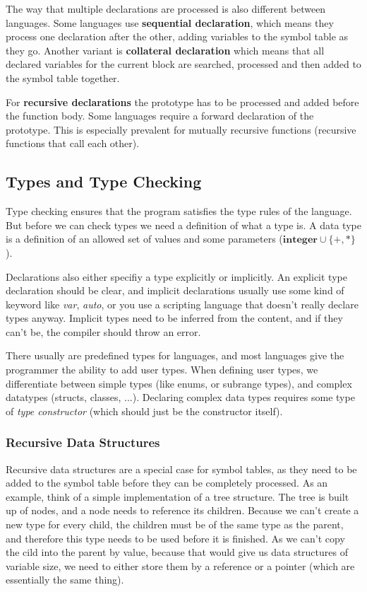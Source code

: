 \documentclass{article}
\begin{document}
The way that multiple declarations are processed is also different between languages.
Some languages use \textbf{sequential declaration}, which means they process one declaration after the other, adding variables to the symbol table as they go.
Another variant is \textbf{collateral declaration} which means that all declared variables for the current block are searched, processed and then added to the symbol table together.

For \textbf{recursive declarations} the prototype has to be processed and added before the function body.
Some languages require a forward declaration of the prototype.
This is especially prevalent for mutually recursive functions (recursive functions that call each other).

\subsection{Types and Type Checking}
Type checking ensures that the program satisfies the type rules of the language.
But before we can check types we need a definition of what a type is.
A data type is a definition of an allowed set of values and some parameters ($\textbf{integer} \cup \{+,*\}$).

Declarations also either specifiy a type explicitly or implicitly.
An explicit type declaration should be clear, and implicit declarations usually use some kind of keyword like \emph{var}, \emph{auto}, or you use a scripting language that doesn't really declare types anyway.
Implicit types need to be inferred from the content, and if they can't be, the compiler should throw an error.

There usually are predefined types for languages, and most languages give the programmer the ability to add user types.
When defining user types, we differentiate between simple types (like enums, or subrange types), and complex datatypes (structs, classes, ...).
Declaring complex data types requires some type of \emph{type constructor} (which should just be the constructor itself). %

\subsubsection{Recursive Data Structures}
Recursive data structures are a special case for symbol tables, as they need to be added to the symbol table before they can be completely processed.
As an example, think of a simple implementation of a tree structure.
The tree is built up of nodes, and a node needs to reference its children.
Because we can't create a new type for every child, the children must be of the same type as the parent, and therefore this type needs to be used before it is finished.
As we can't copy the cild into the parent by value, because that would give us data structures of variable size, we need to either store them by a reference or a pointer (which are essentially the same thing).
\end{document}
